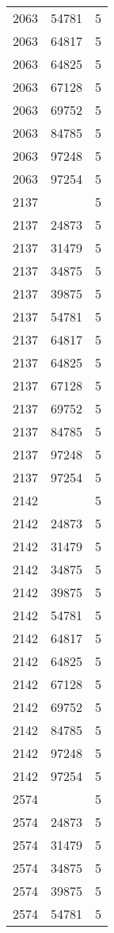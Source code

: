 {{\begin{tabular}{|c|c||c|}
2063&54781&5\\ 2063&64817&5\\ 2063&64825&5\\ 2063&67128&5\\ 2063&69752&5\\ 2063&84785&5\\ 2063&97248&5\\ 2063&97254&5\\ 2137& &5\\ 2137&24873&5\\ 2137&31479&5\\ 2137&34875&5\\ 2137&39875&5\\ 2137&54781&5\\ 2137&64817&5\\ 2137&64825&5\\ 2137&67128&5\\ 2137&69752&5\\ 2137&84785&5\\ 2137&97248&5\\ 2137&97254&5\\ 2142& &5\\ 2142&24873&5\\ 2142&31479&5\\ 2142&34875&5\\ 2142&39875&5\\ 2142&54781&5\\ 2142&64817&5\\ 2142&64825&5\\ 2142&67128&5\\ 2142&69752&5\\ 2142&84785&5\\ 2142&97248&5\\ 2142&97254&5\\ 2574& &5\\ 2574&24873&5\\ 2574&31479&5\\ 2574&34875&5\\ 2574&39875&5\\ 2574&54781&5\\ 
        \hline
        \end{tabular}
    }
}

